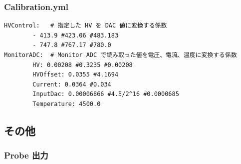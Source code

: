 \documentclass{jsarticle}
\begin{document}
\subsubsection{Calibration.yml}

\begin{shadebox}
\begin{verbatim}
HVControl:   # 指定した HV を DAC 値に変換する係数
        - 413.9 #423.06 #483.183
        - 747.8 #767.17 #780.0
MonitorADC:  # Monitor ADC で読み取った値を電圧、電流、温度に変換する係数
        HV: 0.00208 #0.3235 #0.00208
        HVOffset: 0.0355 #4.1694
        Current: 0.0364 #0.034
        InputDac: 0.00006866 #4.5/2^16 #0.0000685
        Temperature: 4500.0
\end{verbatim}
\end{shadebox}

\newpage
\subsection{その他}

\subsubsection{Probe 出力}
\end{document}
